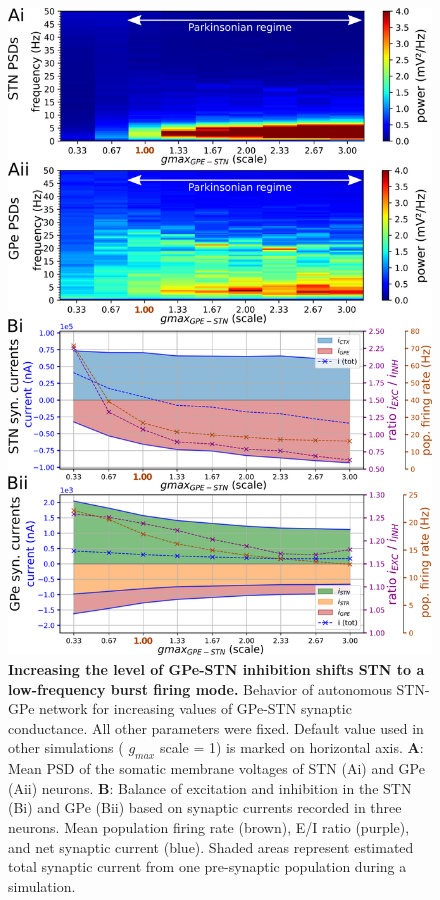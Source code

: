 %
\begin{figure}
\centering
\includegraphics[height=\dimexpr \textheight - 9\baselineskip\relax]{ch_detailed_model/figs_split/fig_endogenous_sweep-gmax-gpe-stn_A-psd-currents.png}
\caption{
\textbf{Increasing the level of GPe-STN inhibition shifts STN to a low-frequency burst firing mode.}
Behavior of autonomous STN-GPe network for increasing values of GPe-STN synaptic conductance. All other parameters were fixed. Default value used in other simulations ({\color{brown} $g_{max}$ scale = 1}) is marked on horizontal axis.
\textbf{A}: Mean PSD of the somatic membrane voltages of STN (Ai) and GPe (Aii) neurons.
\textbf{B}: Balance of excitation and inhibition in the STN (Bi) and GPe (Bii) based on synaptic currents recorded in three neurons. Mean population firing rate (brown), E/I ratio (purple), and net synaptic current (blue). Shaded areas represent estimated total synaptic current from one pre-synaptic population during a simulation.
}
\label{fig:endogenous_sweep-gmax-gpe-stn_A-psd-currents}
\end{figure}

